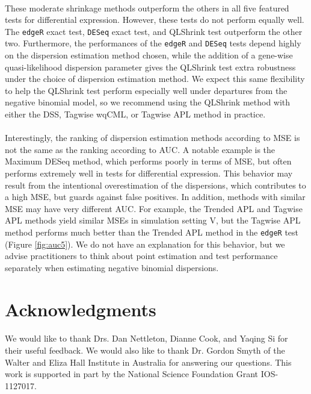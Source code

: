 \documentclass[10pt]{article}
\begin{document}
\paragraph{} \indent These moderate shrinkage methods outperform the others in all five featured tests for differential expression. However, these tests do not perform equally well. The {\tt edgeR} exact test, {\tt DESeq} exact test, and QLShrink test outperform the other two. Furthermore, the performances of the {\tt edgeR} and {\tt DESeq} tests depend highly on the dispersion estimation method chosen, while the addition of a gene-wise quasi-likelihood dispersion parameter gives the QLShrink test extra robustness under the choice of dispersion estimation method. We expect this same flexibility to help the QLShrink test perform especially well under departures from the negative binomial model, so we recommend using the QLShrink method with either the DSS, Tagwise wqCML, or Tagwise APL method in practice.

\paragraph{} \indent Interestingly, the ranking of dispersion estimation methods according to MSE is not the same as the ranking according to AUC. A notable example is the Maximum DESeq method, which performs poorly in terms of MSE, but often performs extremely well in tests for differential expression. This behavior may result from the intentional overestimation of the dispersions, which contributes to a high MSE, but guards against false positives.  In addition, methods with similar MSE may have very different AUC. For example, the Trended APL and Tagwise APL methods yield similar MSEs in simulation setting V, but the Tagwise APL method performs much better than the Trended APL method in the {\tt edgeR} test (Figure \ref{fig:auc5}). We do not have an explanation for this behavior, but we advise practitioners to think about point estimation and test performance separately when estimating negative binomial dispersions.

\section*{Acknowledgments}

\paragraph{} \indent We would like to thank Drs. Dan Nettleton, Dianne Cook, and Yaqing Si for their useful feedback. We would also like to thank Dr. Gordon Smyth of the Walter and Eliza Hall Institute in Australia for answering our questions. This work is supported in part by the National Science Foundation Grant IOS-1127017. 
\end{document}
